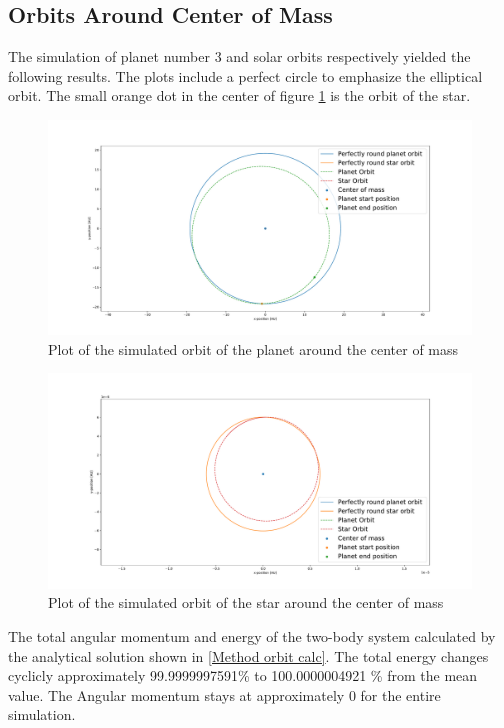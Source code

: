 \documentclass[reprint,english,notitlepage]{revtex4-2}
\begin{document}
\subsection{Orbits Around Center of Mass}
	The simulation of planet number 3 and solar orbits respectively yielded the following results. The plots include a perfect circle to emphasize the elliptical orbit. The small orange dot in the center of figure \ref{fig: P_orbit_cm} is the orbit of the star. 
	\begin{figure}[h!]
	  \centering
	  \includegraphics[scale = .15]{Figures/Planet_Orbit_CM.pdf}
	  \caption{Plot of the simulated orbit of the planet around the center of mass}
	  \label{fig: P_orbit_cm}
	\end{figure}
	
	\begin{figure}[h!]
	  \centering
	  \includegraphics[scale = .15]{Figures/Solar_Orbit_CM.pdf}
	  \caption{Plot of the simulated orbit of the star around the center of mass}
	  \label{fig: S_orbit_cm}
	\end{figure}
	
	The total angular momentum and energy of the two-body system calculated by the analytical solution shown in \ref{Method orbit calc}. The total energy changes cyclicly approximately  99.9999997591\% to  100.0000004921 \%  from the mean value. The Angular momentum stays at approximately  0 for the entire simulation. 
	
\end{document}
